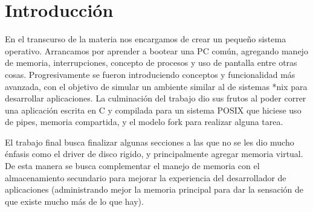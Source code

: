 \section{Introducción}

En el transcurso de la materia nos encargamos de crear un pequeño sistema
operativo. Arrancamos por aprender a bootear una PC común, agregando manejo de
memoria, interrupciones, concepto de procesos y uso de pantalla entre otras
cosas. Progresivamente se fueron introduciendo conceptos y funcionalidad más
avanzada, con el objetivo de simular un ambiente similar al de sistemas *nix
para desarrollar aplicaciones. La culminación del trabajo dio sus frutos al
poder correr una aplicación escrita en C y compilada para un sistema POSIX que
hiciese uso de pipes, memoria compartida, y el modelo fork para realizar alguna tarea.

El trabajo final busca finalizar algunas secciones a las que no se
les dio mucho énfasis como el driver de disco rigido, y principalmente
agregar memoria virtual. De esta manera se busca complementar el manejo de
memoria con el almacenamiento secundario para mejorar la experiencia del
desarrollador de aplicaciones (administrando mejor la memoria principal para dar
la sensación de que existe mucho más de lo que hay).
